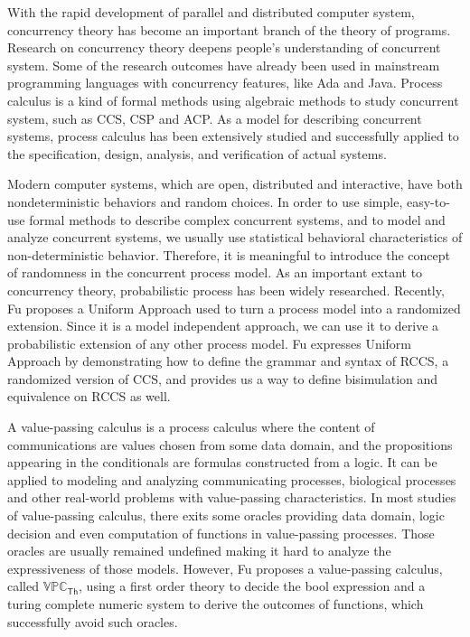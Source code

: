 
\begin{digest}
  With the rapid development of parallel and distributed computer system, concurrency theory has become an important branch of the theory of programs. Research on concurrency theory deepens people’s understanding of concurrent system. Some of the research outcomes have already been used in mainstream programming languages with concurrency features, like Ada and Java. Process calculus is a kind of formal methods using algebraic methods to study concurrent system, such as CCS, CSP and ACP. As a model for describing concurrent systems, process calculus has been extensively studied and successfully applied to the specification, design, analysis, and verification of actual systems.
  
  Modern computer systems, which are open, distributed and interactive, have both nondeterministic behaviors and random choices. In order to use simple, easy-to-use formal methods to describe complex concurrent systems, and to model and analyze concurrent systems, we usually use statistical behavioral characteristics of non-deterministic behavior. Therefore, it is meaningful to introduce the concept of randomness in the concurrent process model. As an important extant to concurrency theory, probabilistic process has been widely researched. Recently, Fu proposes a Uniform Approach used to turn a process model into a randomized extension. Since it is a model independent approach, we can use it to derive a probabilistic extension of any other process model. Fu expresses Uniform Approach by demonstrating how to define the grammar and syntax of RCCS, a randomized version of CCS, and provides us a way to define bisimulation and equivalence on RCCS as well.

  A value-passing calculus is a process calculus where the content of communications are values chosen from some data domain, and the propositions appearing in the conditionals are formulas constructed from a logic. It can be applied to modeling and analyzing communicating processes, biological processes and other real-world problems with value-passing characteristics. In most studies of value-passing calculus, there exits some oracles providing data domain, logic decision and even computation of functions in value-passing processes. Those oracles are usually remained undefined making it hard to analyze the expressiveness of those models. However, Fu proposes a value-passing calculus, called $\mathbb{VPC}_{\mathsf{Th}}$, using a first order theory to decide the bool expression and a turing complete numeric system to derive the outcomes of functions, which successfully avoid such oracles. 
  

\end{digest}
